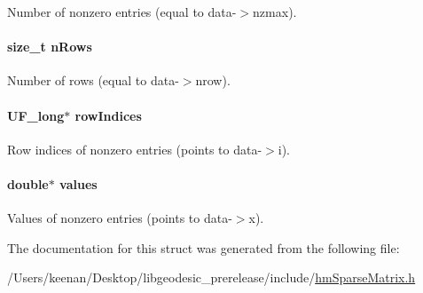 Number of nonzero entries (equal to data-\/$>$nzmax). 

\hypertarget{structhm_sparse_matrix_a7fbc9f4a4303c885a43e849d118e843f}{
\paragraph[{n\-Rows}]{\setlength{\rightskip}{0pt plus 5cm}size\-\_\-t n\-Rows}}\label{structhm_sparse_matrix_a7fbc9f4a4303c885a43e849d118e843f}


Number of rows (equal to data-\/$>$nrow). 

\hypertarget{structhm_sparse_matrix_aa7efdb42536c3242eb0dc426a820edb3}{
\paragraph[{row\-Indices}]{\setlength{\rightskip}{0pt plus 5cm}U\-F\-\_\-long$\ast$ row\-Indices}}\label{structhm_sparse_matrix_aa7efdb42536c3242eb0dc426a820edb3}


Row indices of nonzero entries (points to data-\/$>$i). 

\hypertarget{structhm_sparse_matrix_a2098158062e3e63fce7d2575b324c386}{
\paragraph[{values}]{\setlength{\rightskip}{0pt plus 5cm}double$\ast$ values}}\label{structhm_sparse_matrix_a2098158062e3e63fce7d2575b324c386}


Values of nonzero entries (points to data-\/$>$x). 



The documentation for this struct was generated from the following file\-:\begin{DoxyCompactItemize}
\item 
/\-Users/keenan/\-Desktop/libgeodesic\-\_\-prerelease/include/\hyperlink{hm_sparse_matrix_8h}{hm\-Sparse\-Matrix.\-h}\end{DoxyCompactItemize}
